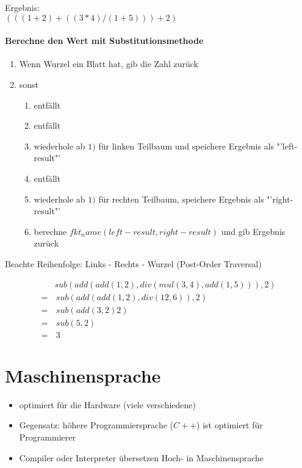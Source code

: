 \documentclass{article}
\begin{document}
		Ergebnis: \\
		$(((1 + 2) + ((3 * 4)/(1 + 5))) + 2)$
		
		\paragraph{Berechne den Wert mit Substitutionsmethode}
		\begin{enumerate}
			\item Wenn Wurzel ein Blatt hat, gib die Zahl zurück
			\item sonst
			\begin{enumerate}
				\item entfällt
				\item entfällt
				\item wiederhole ab $1)$ für linken Teilbaum und speichere Ergebnis als "'left-result"'
				\item entfällt
				\item wiederhole ab $1)$ für rechten Teilbaum, speichere Ergebnis als "'right-result"'
				\item berechne $fkt_name(left-result, right-result)$ und gib Ergebnis zurück
			\end{enumerate}
		\end{enumerate}
		Beachte Reihenfolge: Links - Rechts - Wurzel (Post-Order Traversal)
		
		\begin{align*}
		&  	sub(add(add(1,2), div(mul(3,4), add(1,5))),2) \\
		= & \, sub(add(add(1,2), div(12, 6)),2) \\
		= & \, sub(add(3,2)2) \\
		= & \, sub(5,2) \\
		= & \, 3
		\end{align*}
		
		\section{Maschinensprache}
		\begin{itemize}
			\item optimiert für die Hardware (viele verschiedene)
			\item Gegensatz: höhere Programmiersprache ($C++$) ist optimiert für Programmierer
			\item Compiler oder Interpreter übersetzen Hoch- in Maschinensprache 
		\end{itemize}
		
\end{document}
